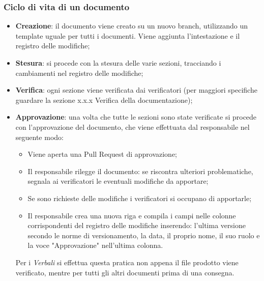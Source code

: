 \subsubsection{Ciclo di vita di un documento}
\begin{itemize}
    \item \textbf{Creazione}: il documento viene creato su un nuovo branch, utilizzando un template uguale per tutti i documenti. 
    Viene aggiunta l’intestazione e il registro delle modifiche;
    \item \textbf{Stesura}: si procede con la stesura delle varie sezioni, tracciando i cambiamenti nel registro delle modifiche; 
    \item \textbf{Verifica}: ogni sezione viene verificata dai verificatori (per maggiori specifiche guardare la 
    sezione x.x.x Verifica della documentazione);
    \item \textbf{Approvazione}: una volta che tutte le sezioni sono state verificate si procede 
    con l’approvazione del documento, che viene effettuata dal responsabile nel seguente modo:
    \begin{itemize}
        \item Viene aperta una Pull Request di approvazione;
        \item Il responsabile rilegge il documento: se riscontra ulteriori problematiche, segnala ai verificatori le eventuali modifiche da apportare;
        \item Se sono richieste delle modifiche i verificatori si occupano di apportarle;
        \item Il responsabile crea una nuova riga e compila i campi nelle colonne corrispondenti del registro delle modifiche 
        inserendo: l'ultima versione secondo le norme di versionamento, la data, il proprio nome, il suo ruolo e la voce "Approvazione" nell'ultima colonna.
    \end{itemize}
    Per i \textit{Verbali} si effettua questa pratica non appena il file prodotto viene 
    verificato, mentre per tutti gli altri documenti prima di una consegna.
\end{itemize}